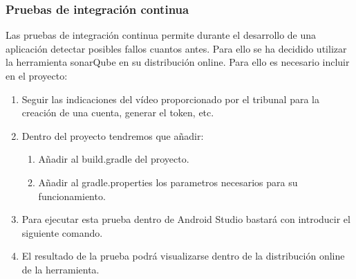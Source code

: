 \subsubsection{Pruebas de integración continua}

Las pruebas de integración continua permite durante el desarrollo de una aplicación detectar posibles fallos cuantos antes. Para ello se ha decidido utilizar la herramienta sonarQube en su distribución online.
Para ello es necesario incluir en el proyecto:

\begin{enumerate}
	\item Seguir las indicaciones del vídeo proporcionado por el tribunal para la creación de una cuenta, generar el token, etc.
	\item Dentro del proyecto tendremos que añadir:
		\begin{enumerate}
			\item Añadir al build.gradle del proyecto. 
			\item Añadir al gradle.properties los parametros necesarios para su funcionamiento.
		\end{enumerate}
	\item Para ejecutar esta prueba dentro de Android Studio bastará con introducir el siguiente comando. 
	
	\item El resultado de la prueba podrá visualizarse dentro de la distribución online de la herramienta.
\end{enumerate}



